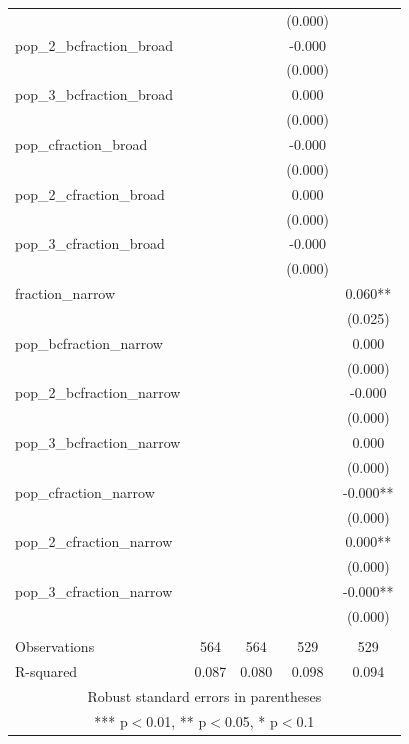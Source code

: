 \documentclass[]{article}
\begin{document}
\begin{tabular}{lcccc}
 &  &  & (0.000) &  \\
pop\_2\_bcfraction\_broad &  &  & -0.000 &  \\
 &  &  & (0.000) &  \\
pop\_3\_bcfraction\_broad &  &  & 0.000 &  \\
 &  &  & (0.000) &  \\
pop\_cfraction\_broad &  &  & -0.000 &  \\
 &  &  & (0.000) &  \\
pop\_2\_cfraction\_broad &  &  & 0.000 &  \\
 &  &  & (0.000) &  \\
pop\_3\_cfraction\_broad &  &  & -0.000 &  \\
 &  &  & (0.000) &  \\
fraction\_narrow &  &  &  & 0.060** \\
 &  &  &  & (0.025) \\
pop\_bcfraction\_narrow &  &  &  & 0.000 \\
 &  &  &  & (0.000) \\
pop\_2\_bcfraction\_narrow &  &  &  & -0.000 \\
 &  &  &  & (0.000) \\
pop\_3\_bcfraction\_narrow &  &  &  & 0.000 \\
 &  &  &  & (0.000) \\
pop\_cfraction\_narrow &  &  &  & -0.000** \\
 &  &  &  & (0.000) \\
pop\_2\_cfraction\_narrow &  &  &  & 0.000** \\
 &  &  &  & (0.000) \\
pop\_3\_cfraction\_narrow &  &  &  & -0.000** \\
 &  &  &  & (0.000) \\
 &  &  &  &  \\
Observations & 564 & 564 & 529 & 529 \\
 R-squared & 0.087 & 0.080 & 0.098 & 0.094 \\ \hline
\multicolumn{5}{c}{ Robust standard errors in parentheses} \\
\multicolumn{5}{c}{ *** p$<$0.01, ** p$<$0.05, * p$<$0.1} \\
\end{tabular}
\end{document}
